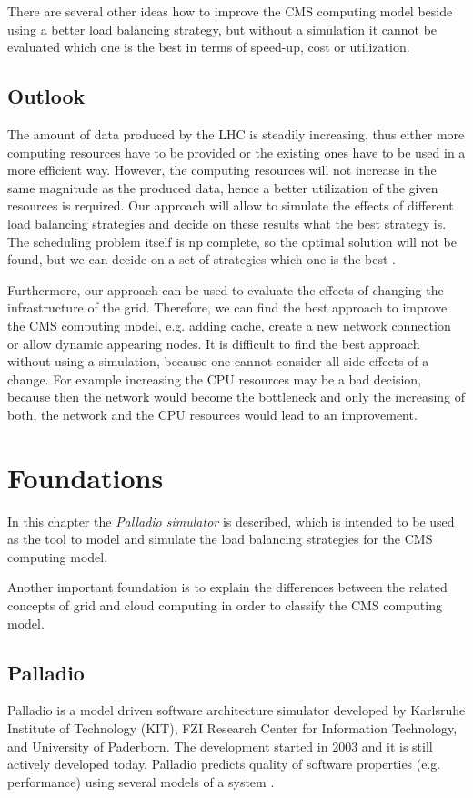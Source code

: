 There are several other ideas how to improve the CMS computing model beside using a better load balancing strategy, but without a simulation it cannot be evaluated which one is the best in terms of speed-up, cost or utilization.
\newpage

\section{Outlook}
The amount of data produced by the LHC is steadily increasing, thus either more computing resources have to be provided or the existing ones have to be used in a more efficient way.
However, the computing resources will not increase in the same magnitude as the produced data, hence a better utilization of the given resources is required. Our approach will allow to simulate the effects of different load balancing strategies and decide on these results what the best strategy is. The scheduling problem itself is np complete, so the optimal solution will not be found, but we can decide on a set of strategies which one is the best \cite{1698650}.

Furthermore, our approach can be used to evaluate the effects of changing the infrastructure of the grid. Therefore, we can find the best approach to improve the CMS computing model, e.g. adding cache, create a new network connection or allow dynamic appearing nodes.
It is difficult to find the best approach without using a simulation, because one cannot consider all side-effects of a change. For example increasing the CPU resources may be a bad decision, because then the network would become the bottleneck and only the increasing of both, the network and the CPU resources would lead to an improvement.

\chapter {Foundations}
In this chapter the \textit{Palladio simulator} is described, which is intended to be used as the tool to model and simulate the load balancing strategies for the CMS computing model.

Another important foundation is to explain the differences between the related concepts of grid and cloud computing in order to classify the CMS computing model.

\section{Palladio}
\label{palladio}
Palladio is a model driven software architecture simulator developed by Karlsruhe Institute of Technology (KIT), FZI Research Center for Information Technology, and University of Paderborn. The development started in 2003 and it is still actively developed today. Palladio predicts quality of software properties (e.g. performance) using several models of a system \cite{BECKER20093}.

